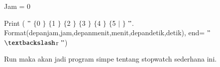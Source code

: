 \noindent 
{\fontsize{14pt}{14pt}\selectfont Jam = 0 \\} \par
\noindent 
{\fontsize{14pt}{14pt}\selectfont Print ( $ " $ $  \{  $0 $  \}  $ $  \{  $1 $  \}  $ $  \{  $2 $  \}  $ $  \{  $3 $  \}  $ $  \{  $4 $  \}  $ $  \{  $5 $  \vert  $ $  \}  $ $ " $. Format(depanjam,jam,depanmenit,menit,depandetik,detik), end= $ " $ $  \textbackslash  $r $ " $) \\} \par
\vspace{14pt}
\noindent 
{\fontsize{14pt}{14pt}\selectfont Run maka akan jadi program simpe tentang stopwatch sederhana ini. \\} \par
